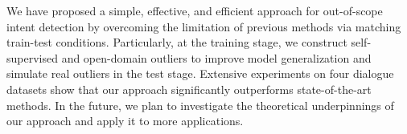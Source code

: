 
We have proposed a simple, effective, and efficient approach for out-of-scope intent detection by overcoming the limitation of previous methods via matching train-test conditions. Particularly, at the training stage, we construct self-supervised and open-domain outliers to improve model generalization and simulate real outliers in the test stage. Extensive experiments on four dialogue datasets show that our approach significantly outperforms state-of-the-art methods. In the future, we plan to investigate the theoretical underpinnings of our approach and apply it to more applications.


